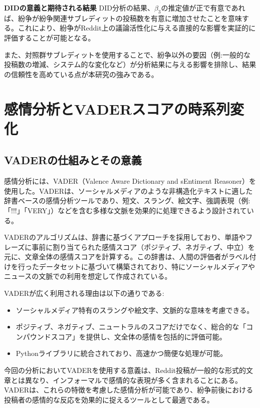 \documentclass[11pt, a4j]{jreport}
\begin{document}
    \textbf{DIDの意義と期待される結果}
    DID分析の結果、$\beta_{3}$の推定値が正で有意であれば、紛争が紛争関連サブレディットの投稿数を有意に増加させたことを意味する。これにより、紛争がReddit上の議論活性化に与える直接的な影響を実証的に評価することが可能となる。

    また、対照群サブレディットを使用することで、紛争以外の要因（例:一般的な投稿数の増減、システム的な変化など）が分析結果に与える影響を排除し、結果の信頼性を高めている点が本研究の強みである。

    \section{感情分析とVADERスコアの時系列変化}

    \subsection*{VADERの仕組みとその意義}
    感情分析には、VADER（Valence Aware Dictionary and sEntiment Reasoner）を使用した。VADERは、ソーシャルメディアのような非構造化テキストに適した辞書ベースの感情分析ツールであり、短文、スラング、絵文字、強調表現（例:「!!!」「VERY」）などを含む多様な文脈を効果的に処理できるよう設計されている。

    VADERのアルゴリズムは、辞書に基づくアプローチを採用しており、単語やフレーズに事前に割り当てられた感情スコア（ポジティブ、ネガティブ、中立）を元に、文章全体の感情スコアを計算する。この辞書は、人間の評価者がラベル付けを行ったデータセットに基づいて構築されており、特にソーシャルメディアやニュースの文脈での利用を想定して作成されている。

    VADERが広く利用される理由は以下の通りである:
    \begin{itemize}
        \item ソーシャルメディア特有のスラングや絵文字、文脈的な意味を考慮できる。
        \item ポジティブ、ネガティブ、ニュートラルのスコアだけでなく、総合的な「コンパウンドスコア」を提供し、文全体の感情を包括的に評価可能。
        \item Pythonライブラリに統合されており、高速かつ簡便な処理が可能。
    \end{itemize}

    今回の分析においてVADERを使用する意義は、Reddit投稿が一般的な形式的文章とは異なり、インフォーマルで感情的な表現が多く含まれることにある。VADERは、これらの特徴を考慮した感情分析が可能であり、紛争前後における投稿者の感情的な反応を効果的に捉えるツールとして最適である。
\end{document}
